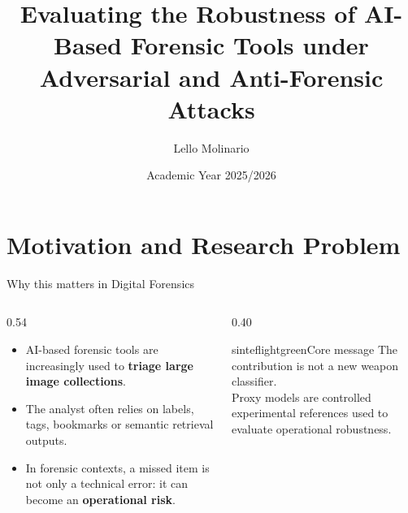 \documentclass{beamer}
\title{Evaluating the Robustness of AI-Based Forensic Tools under Adversarial and Anti-Forensic Attacks}
\author{Lello Molinario}
\date{Academic Year 2025/2026}
\newcommand{\highlight}[1]{\textcolor{maincolor}{\textbf{#1}}}
\begin{document}
\maketitle

\section{Motivation and Research Problem}

\begin{frame}{Why this matters in Digital Forensics}
\begin{columns}
\begin{column}{0.54\textwidth}
\begin{itemize}
    \item AI-based forensic tools are increasingly used to \highlight{triage large image collections}.
    \item The analyst often relies on labels, tags, bookmarks or semantic retrieval outputs.
    \item In forensic contexts, a missed item is not only a technical error: it can become an \highlight{operational risk}.
\end{itemize}
\end{column}

\begin{column}{0.40\textwidth}
\begin{colorblock}[black]{sinteflightgreen}{Core message}
The contribution is not a new weapon classifier.\\[0.35em]
Proxy models are controlled experimental references used to evaluate operational robustness.
\end{colorblock}
\end{column}
\end{columns}
\end{frame}

\end{document}
